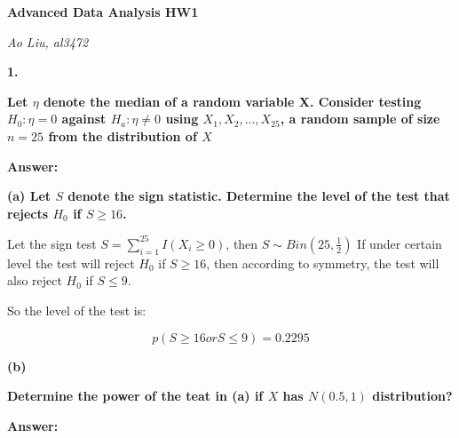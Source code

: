 \documentclass[letterpaper,11pt]{article}
\begin{document}
  \begin{center}
  	\textbf{\Huge{Advanced Data Analysis HW1}}
  \end{center}

  \begin{center}
  	\textsl{Ao Liu, al3472}
  \end{center}


  \bigbreak
  \bigbreak
  \bigbreak



    \begin{addmargin}[-2em]{0em} \large{\textbf{1. }}\end{addmargin}
    \begin{addmargin}[-1.1em]{0em} \textbf{Let $\eta$ denote the median of a random variable X. Consider testing $H_0: \eta = 0$ against $H_a: \eta \neq 0$ using $X_1,X_2,...,X_{25}$, a random sample of size $n = 25$ from the distribution of $X$}\par \end{addmargin}
\bigbreak
\begin{addmargin}[-0.5em]{0em}
\textbf{Answer: }\end{addmargin}


  \begin{addmargin}[-1.1em]{0em} \textbf{(a)  Let $S$ denote the sign statistic. Determine the level of the test that rejects $H_0$ if $S\geq16$.}\par \end{addmargin}

Let the sign test $S = \sum_{i=1}^{25}I(X_i\geq0)$, then $S\sim Bin(25,\frac{1}{2})$
If under certain level the test will reject $H_0$ if $S\geq16$, then according to symmetry, the test will also reject $H_0$ if $S\leq9$.\par
So the level of the test is:\par
$$p(S\geq16 or S\leq9)=0.2295$$
\bigbreak


\begin{addmargin}[-1.1em]{0em}
\textbf{(b)}\par\end{addmargin}
  \textbf{Determine the power of the teat in
  (a) if $X$ has $N(0.5,1)$ distribution?} \par
\bigbreak

\begin{addmargin}[-0.5em]{0em}
\textbf{Answer: }\end{addmargin}
\end{document}
